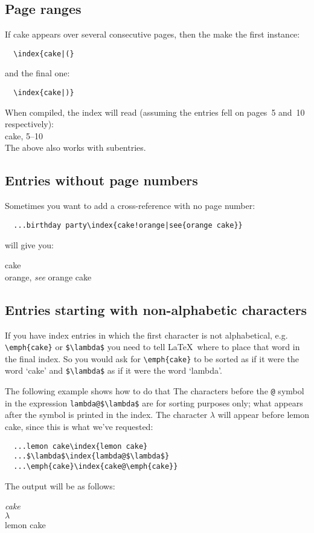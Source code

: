 \subsection{Page ranges}
If cake appears over several consecutive pages, then the make the first instance:
\begin{verbatim}
  \index{cake|(}
\end{verbatim}
and the final one:
\begin{verbatim}
  \index{cake|)}
\end{verbatim}
When compiled, the index will read (assuming the entries fell on
pages~5 and~10 respectively):\\[0.5\baselineskip]
{\indexsize cake, 5--10}\\[0.5\baselineskip]
The above also works with subentries.

\subsection{Entries without page numbers}
Sometimes you want to add a cross-reference with no page number:
\begin{verbatim}
  ...birthday party\index{cake!orange|see{orange cake}}
\end{verbatim}
will give you:\\[0.5\baselineskip]
{\indexsize cake\\
\mbox{}\quad orange, \textit{see} orange\vadjust{\vspace{3pt}} cake\par}

\subsection{Entries starting with non-alphabetic characters}
If you have index entries in which the first character
is not alphabetical, e.g. \verb"\emph{cake}" or \verb"$\lambda$" you
need to tell \LaTeX\ where to place that word in the final index.
So you would ask for \verb"\emph{cake}" to be sorted as if it
were the word `cake' and \verb"$\lambda$" as if it were the word `lambda'.

The following example shows how to do that
The characters before the \verb"@" symbol in the expression
\verb"lambda@$\lambda$" are for sorting purposes only; what
appears after the symbol is printed in the index. The
character $\lambda$ will appear before lemon cake, since this is what we've requested:
\begin{verbatim}
  ...lemon cake\index{lemon cake}
  ...$\lambda$\index{lambda@$\lambda$}
  ...\emph{cake}\index{cake@\emph{cake}}
\end{verbatim}
The output will be as follows:\\[0.5\baselineskip]
{\indexsize \emph{cake}\\
$\lambda$\\
lemon cake\par}

